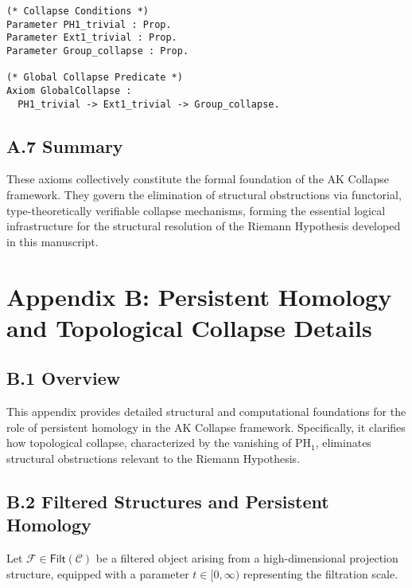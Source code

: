 \documentclass[11pt]{article}
\begin{document}
\begin{lstlisting}[language=Coq, caption=Coq Formalization of Global Collapse Axioms, captionpos=b]
(* Collapse Conditions *)
Parameter PH1_trivial : Prop.
Parameter Ext1_trivial : Prop.
Parameter Group_collapse : Prop.

(* Global Collapse Predicate *)
Axiom GlobalCollapse :
  PH1_trivial -> Ext1_trivial -> Group_collapse.
\end{lstlisting}

\subsection*{A.7 Summary}

These axioms collectively constitute the formal foundation of the AK Collapse framework. They govern the elimination of structural obstructions via functorial, type-theoretically verifiable collapse mechanisms, forming the essential logical infrastructure for the structural resolution of the Riemann Hypothesis developed in this manuscript.



\section*{Appendix B: Persistent Homology and Topological Collapse Details}

\subsection*{B.1 Overview}

This appendix provides detailed structural and computational foundations for the role of persistent homology in the AK Collapse framework. Specifically, it clarifies how topological collapse, characterized by the vanishing of $\mathrm{PH}_1$, eliminates structural obstructions relevant to the Riemann Hypothesis.

\subsection*{B.2 Filtered Structures and Persistent Homology}

Let $\mathcal{F} \in \mathsf{Filt}(\mathcal{C})$ be a filtered object arising from a high-dimensional projection structure, equipped with a parameter $t \in [0, \infty)$ representing the filtration scale.
\end{document}
